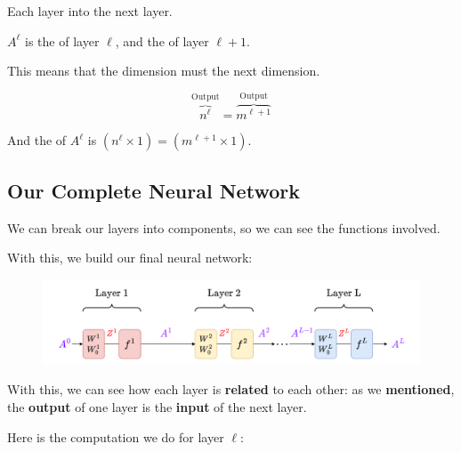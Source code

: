         \begin{concept}
            Each layer  into the next layer.
            
            $A^\ell$ is the  of layer $\ell$, and the  of layer $\ell+1$.
            
            This means that the  dimension must  the next  dimension.
            
            \begin{equation*}
                \overbrace{
                    n^\ell
                }^{\text{Output}}
                =
                \overbrace{
                    m^{\ell+1}
                }^{\text{Output}}
            \end{equation*}
            
            And the  of $A^\ell$ is $(n^\ell \times 1) = (m^{\ell+1} \times 1)$.
        \end{concept}
        
    \subsection*{Our Complete Neural Network}
    
        We can break our layers into components, so we can see the functions involved. 
        
        With this, we build our final neural network:
        
        \begin{figure}[H]
            \centering
            \includegraphics[width=140mm,scale=0.4]{images/nn_images/final_neural_network.png}
        \end{figure}
        
        With this, we can see how each layer is \textbf{related} to each other: as we \textbf{mentioned}, the \textbf{output} of one layer is the \textbf{input} of the next layer.
        
        Here is the computation we do for layer $\ell$:\\
        
